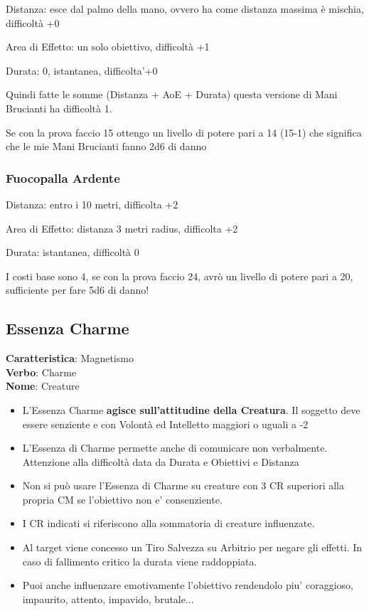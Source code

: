 \documentclass[a4paper,11pt,twoside,openany]{book}
\begin{document}
Distanza: esce dal palmo della mano, ovvero ha come distanza massima è mischia, difficoltà +0

Area di Effetto: un solo obiettivo, difficoltà +1

Durata: 0, istantanea, difficolta'+0

Quindi fatte le somme (Distanza + AoE + Durata) questa versione di Mani Brucianti ha difficoltà 1.

Se con la prova faccio 15 ottengo un livello di potere pari a 14 (15-1) che significa che le mie Mani Brucianti fanno 2d6 di danno

\subsubsection{Fuocopalla Ardente}

Distanza: entro i 10 metri, difficolta +2

Area di Effetto: distanza 3 metri radius, difficolta +2

Durata: istantanea, difficoltà 0

I costi base sono 4, se con la prova faccio 24, avrò un livello di potere pari a 20, sufficiente per fare 5d6 di danno!

\pagebreak

\subsection{Essenza Charme}

\textbf{Caratteristica}: Magnetismo\\
\textbf{Verbo}: Charme\\
\textbf{Nome}: Creature\\

\label{essenza-charme---magnetismo}

\begin{itemize}
	\item
	      L'Essenza Charme \textbf{agisce sull'attitudine della Creatura}. Il soggetto deve essere senziente e con Volontà ed Intelletto maggiori o uguali a -2
	\item
	      L'Essenza di Charme permette anche di comunicare non verbalmente. Attenzione alla difficoltà data da Durata e Obiettivi e Distanza
	\item
	      Non si può usare l'Essenza di Charme su creature con 3 CR superiori alla propria CM se l'obiettivo non e' consenziente.
	\item
	      I CR indicati si riferiscono alla sommatoria di creature influenzate.
	\item
	      Al target viene concesso un Tiro Salvezza su Arbitrio per negare gli effetti. In caso di fallimento critico la durata viene raddoppiata.
	\item
Puoi anche influenzare emotivamente l'obiettivo rendendolo piu' coraggioso, impaurito, attento, impavido, brutale...      
\end{itemize}
\end{document}
